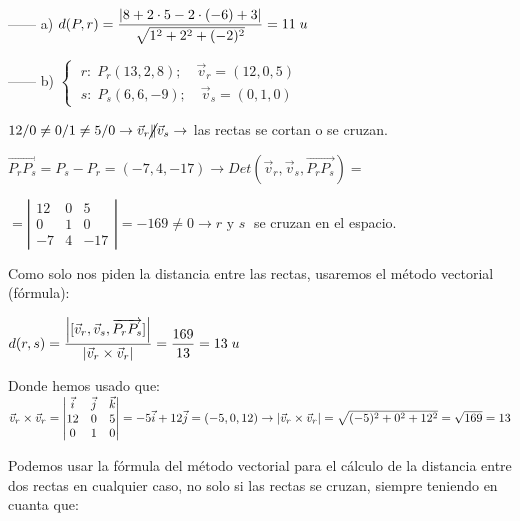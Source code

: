 \begin{proofw}\renewcommand{\qedsymbol}{$\diamond$}

\noindent ------ a) $d(P,r)=\dfrac {\abs{8+2\cdot 5-2\cdot (-6)+3}}{\sqrt{1^2+2^2+(-2)^2}}=11\; u$

\noindent ------ b) 
$\begin{cases}\;  r:\; P_r(13,2,8);\quad \vec v_r=(12,0,5)
\\ \; s:\; P_s(6,6,-9);\quad \vec v_s=(0,1,0) \end{cases}$

\noindent $12/0 \neq 0/1 \neq 5/0 \to \vec v_r \cancel{\parallel} \vec v_s \to $ las rectas se cortan o se cruzan.

\noindent $\overrightarrow{P_rP_s}=P_s-P_r=(-7,4,-17) \to Det(\vec v_r, \vec v_s,\overrightarrow{P_rP_s})= $

\noindent $=\left| \begin{matrix} 12&0&5\\0&1&0\\-7&4&-17 \end{matrix}\right|=-169\neq 0 \to r \text{ y } s \;$ se cruzan en el espacio.

\noindent Como solo nos piden la distancia entre las rectas, usaremos el método vectorial (fórmula):

\noindent $d(r,s)=\dfrac {\abs{[\vec v_r, \vec v_s,\overrightarrow{P_rP_s}]}}{\abs{\vec v_r \times \vec v_r}}=\dfrac {169}{13}=13\; u$

\noindent Donde hemos usado que: $\vec v_r \times \vec v_r= \left| \begin{matrix} \vec i&\vec j&\vec k\\ 12&0&5\\0&1&0 \end{matrix}\right| =-5\vec i +12 \vec j =(-5,0,12) \to \abs{\vec v_r \times \vec v_r}=\sqrt{(-5)^2+0^2+12^2}=\sqrt{169}=13$

\vspace{4mm} \noindent \textcolor{gris}{Podemos usar la fórmula del método vectorial para el cálculo de la distancia entre dos rectas en cualquier caso, no solo si las rectas se cruzan, siempre teniendo en cuanta que:}


\end{proofw}

